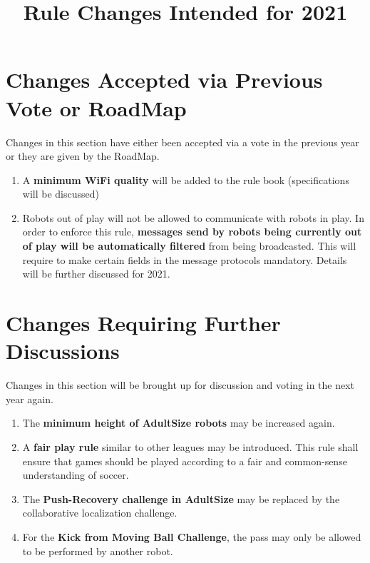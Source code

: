 \documentclass{article}
\title{Rule Changes Intended for 2021}
\date{\vspace{-12ex}}
\begin{document}
\maketitle

\begin{center}

\end{center}

\section{Changes Accepted via Previous Vote or RoadMap }
Changes in this section have either been accepted via a vote in the previous year or they are given by the RoadMap.

\begin{enumerate}
    \item A \textbf{minimum WiFi quality} will be added to the rule book (specifications will be discussed)
    \item Robots out of play will not be allowed to communicate with robots in play. In order to enforce this rule, \textbf{messages send by robots being currently out of play will be automatically filtered} from being broadcasted. This will require to make certain fields in the message protocols mandatory. Details will be further discussed for 2021.
\end{enumerate}

\section{Changes Requiring Further Discussions}
Changes in this section will be brought up for discussion and voting in the next year again.

\begin{enumerate}
    \item The \textbf{minimum height of AdultSize robots} may be increased again.
    \item A \textbf{fair play rule} similar to other leagues may be introduced. This rule shall ensure that games should be played according to a fair and common-sense understanding of soccer.
    \item The \textbf{Push-Recovery challenge in AdultSize} may be replaced by the collaborative localization challenge.
    \item For the \textbf{Kick from Moving Ball Challenge}, the pass may only be allowed to be performed by another robot.
\end{enumerate}{}
\end{document}
